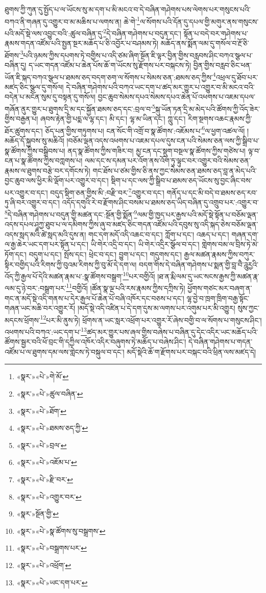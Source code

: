 ཐུགས་ཀྱི་ཀུན་དུ་སྤྱོད་པ་ལ་ཡོངས་སུ་མ་དག་པ་མི་མངའ་བ་དེ་བཞིན་གཤེགས་པས་ལེགས་པར་གསུངས་པའི་བཀའ་ནི་གཞན་དུ་འགྱུར་བ་མ་མཆིས་པ་ལགས་ན། ཆེ་གེ་\footnote{«སྣར་»«པེ་»གེ་མོ་}ལ་སོགས་པའི་དོན་དུ་དཔལ་གྱི་མགུར་ནས་གསུངས་པའི་མདོ་སྡེ་ལས་འབྱུང་བའི་:ཚུལ་བཞིན་དུ་\footnote{«སྣར་»«པེ་»ཚུལ་བཞིན་}དེ་བཞིན་གཤེགས་པ་བདུན་དང་། སྟོན་པ་བདེ་བར་གཤེགས་པ་རྣམས་གདན་འཛོམ་པའི་སྤྱན་སྔར་མཆོད་པ་ཅི་འབྱོར་པ་བཤམས་ཏེ། མཆོད་ནས་སྨོན་ལམ་དུ་གསོལ་བ་རྔོ་ཅི་ཐོགས་\footnote{«སྣར་»«པེ་»ཐོག་}པའི་ཉམས་ཀྱིས་དཔགས་ཏེ་བགྱིས་པ་འདི་ཙམ་ཞིག་སྔོན་ཇི་ལྟར་བྱིན་གྱིས་བརླབས་ཤིང་བཀའ་སྩལ་པ་བཞིན་དུ། ད་ཡང་གདན་འཛོམ་པ་ཆེན་པོས་ཆོ་ག་ཡོངས་སུ་རྫོགས་པར་བསྐངས་ཏེ། བྱིན་གྱིས་བརླབ་ཅིང་ཕན་ཡོན་ཇི་སྐད་བཀའ་སྩལ་པ་ཐམས་ཅད་བདག་ཅག་ལ་སོགས་པ་སེམས་ཅན་:ཐམས་ཅད་ཀྱིས་\footnote{«སྣར་»«པེ་»ཐམས་ཅད་ཀྱི་}འཕྲལ་དུ་ཐོབ་པར་མཛད་ཅིང་སྩལ་དུ་གསོལ། དེ་བཞིན་གཤེགས་པའི་བཀའ་ཡང་དག་པ་ཚད་མར་གྱུར་པ་འགྱུར་བ་མི་མངའ་བའི་བདེན་པ་མངོན་སུམ་དུ་བསྟན་དུ་གསོལ། བྱང་ཆུབ་སེམས་དཔའ་སེམས་དཔའ་ཆེན་པོ་འཕགས་པ་འཇམ་དཔལ་གཞོན་ནུར་གྱུར་པ་ཐུགས་དྲི་མ་དང་སྐྱོན་ཐམས་ཅད་དང་:བྲལ་བ་\footnote{«སྣར་»«པེ་»བྲལ་}སྐུ་ཡོན་ཏན་དྲི་མ་མེད་པའི་ཚོགས་ཀྱི་འོད་ཟེར་གྱིས་བརྒྱན་པ། ཞབས་རྟེན་གྱི་པདྨ་ལ་ལྷ་དང་། མི་དང་། ལྷ་མ་ཡིན་དང་། ཀླུ་དང་། རིག་སྔགས་འཆང་རྣམས་ཀྱི་ཐོར་ཚུགས་དང་། ཅོད་པན་གྱིས་གཏུགས་པ། ངན་སོང་གི་འགྲོ་བ་སྣ་ཚོགས་:འཇོམས་པ་\footnote{«སྣར་»«པེ་»འཇོམ་པ་}ལ་ཕྱག་འཚལ་ལོ། །མཆོད་དོ་སྐྱབས་སུ་མཆིའོ། །བཅོམ་ལྡན་འདས་འཕགས་པ་འཇམ་དཔལ་དུས་ངན་པའི་སེམས་ཅན་ལས་ཀྱི་སྒྲིབ་པ་སྣ་ཚོགས་ཀྱིས་བསྒྲིབས་པ། ནད་སྣ་ཚོགས་ཀྱིས་གཟིར་བ། མྱ་ངན་དང་སྡུག་བསྔལ་སྣ་ཚོགས་ཀྱིས་གཙེས་པ། ལྟ་བ་ངན་པ་སྣ་ཚོགས་ཀྱིས་བཀླགས་པ། ལམ་དང་ས་དམན་པར་འོག་ནས་འོག་ཏུ་ལྟུང་བར་འགྱུར་བའི་སེམས་ཅན་རྣམས་ལ་ཐུགས་བརྩེ་བར་དགོངས་ཏེ། གང་ཐོས་པ་ཙམ་གྱིས་ཅི་ནས་ཀྱང་སེམས་ཅན་ཐམས་ཅད་བླ་ན་མེད་པའི་བྱང་ཆུབ་ལས་ཕྱིར་མི་ལྡོག་པར་འགྱུར་བ་དང་། སྡིག་པ་དང་ལས་ཀྱི་སྒྲིབ་པ་ཐམས་ཅད་ཡོངས་སུ་བྱང་ཞིང་བས་པར་འགྱུར་བ་དང་། བདུད་སྡིག་ཅན་གྱིས་མི་:བརྫི་བར་\footnote{«སྣར་»«པེ་»རྫི་བར་}འགྱུར་བ་དང་། གནོད་པ་དང་མི་བདེ་བ་ཐམས་ཅད་རབ་ཏུ་ཞི་བར་འགྱུར་བ་དང་། འདོད་དགུའི་རེ་བ་རྫོགས་ཤིང་བསམ་པ་ཐམས་ཅད་ཡིད་བཞིན་དུ་འགྲུབ་པར་:འགྱུར་བ་\footnote{«སྣར་»«པེ་»འགྱུར་བར་}དེ་བཞིན་གཤེགས་པ་བདུན་གྱི་མཚན་དང་:སྔོན་གྱི་སྨོན་\footnote{«སྣར་»སྔོན་གྱི་}ལམ་གྱི་ཁྱད་པར་རྒྱས་པའི་མདོ་སྡེ་སྟོན་པ་བཅོམ་ལྡན་འདས་དཔལ་ཤཱཀྱ་ཐུབ་པ་ལ་དམིགས་ཀྱིས་ཞུ་བ་མཛད་ཅིང་གདན་འཛོམ་པའི་དབུས་སུ་འདི་སྐད་ཅེས་བཅོམ་ལྡན་འདས་སླད་མའི་ཚེ་སླད་མའི་དུས་ན། གང་དག་མདོ་འདི་འཆང་བ་དང་། ཀློག་པ་དང་། འཆད་པ་དང་། གཞན་དག་ལ་རྒྱ་ཆེར་ཡང་དག་པར་སྟོན་པ་དང་། ཡི་གེར་འདྲི་བ་དང་། ཡི་གེར་འདྲིར་སྩོལ་བ་དང་། གླེགས་བམ་ལ་བྲིས་ཏེ་མེ་ཏོག་དང་། བདུག་པ་དང་། སྤོས་དང་། ཕྲེང་བ་དང་། བྱུག་པ་དང་། གདུགས་དང་། རྒྱལ་མཚན་རྣམས་ཀྱིས་བཀུར་སྟིར་བགྱིད་པའི་རིགས་ཀྱི་བུའམ་རིགས་ཀྱི་བུ་མོ་དེ་དག་ལ། བདག་གིས་དེ་བཞིན་གཤེགས་པ་སྨན་གྱི་བླ་བཻ་ཌཱུརྱའི་འོད་ཀྱི་རྒྱལ་པོ་དེའི་མཚན་རྣམ་པ་:སྣ་ཚོགས་བསྒྲག་\footnote{«སྣར་»«པེ་»སྣ་ཚོགས་སུ་བསྒྲགས་}པར་བགྱིའོ། །ཐ་ན་རྨི་ལམ་དུ་ཡང་སངས་རྒྱས་ཀྱི་མཚན་རྣ་ལམ་དུ་ཉེ་བར་:བསྒྲག་པར་\footnote{«སྣར་»«པེ་»བསྒྲགས་པར་}བགྱིའོ། །ཚོན་སྣ་ལྔ་པའི་རས་རྣམས་ཀྱིས་དཀྲིས་ཏེ། ཕྱོགས་གཙང་མར་བཞག་ན་གང་ན་མདོ་སྡེ་འདི་གནས་པ་དེར་རྒྱལ་པོ་ཆེན་པོ་བཞི་འཁོར་དང་བཅས་པ་དང་། ལྷ་བྱེ་བ་ཁྲག་ཁྲིག་བརྒྱ་སྟོང་གཞན་ཡང་མཆི་བར་འགྱུར་རོ། །མདོ་སྡེ་འདི་འཛིན་པ་དེ་དག་དུས་མ་ལགས་པར་འགུམ་པར་མི་འགྱུར། སུས་ཀྱང་མདངས་ཕྲོགས་\footnote{«སྣར་»«པེ་»འཕྲོག་}པར་མི་ནུས་ཏེ། ཕྲོགས་ན་ཡང་སླར་འཕྲོག་པར་འགྱུར་རོ་ཞེས་བགྱི་བ་ལ་སོགས་པ་གསུངས་ཤིང་། འཕགས་པའི་བཀའ་:ཡང་དག་པ་\footnote{«སྣར་»«པེ་»ཡང་དག་པར་}ཚད་མར་གྱུར་པས་ཞལ་གྱིས་བཞེས་པ་བཞིན་དུ་དེང་འདིར་ཡང་མཆོད་པའི་ཚོགས་སྦྱར་བའི་ཕོ་བྲང་གི་དཀྱིལ་འཁོར་འདིར་བཞུགས་ཏེ་མཆོད་པ་བཞེས་ཤིང་། དེ་བཞིན་གཤེགས་པ་གདན་འཛོམ་པ་ལ་ཐུགས་དམ་ལས་གླེངས་ཏེ་བསྐུལ་བ་དང་། མདོ་སྡེའི་ཆོ་ག་རྫོགས་པར་བསྐང་བའི་ཕྲིན་ལས་མཛད་དེ། 